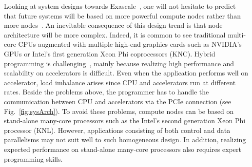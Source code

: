 Looking at system designs towards Exascale~\cite{top500}, one will not hesitate to predict that future systems will be based on more powerful compute nodes rather than more nodes~\cite{Shalf:exascaleChallenges}.  
An inevitable consequence of this design trend is that node architecture will be more complex.
Indeed, it is common to see traditional multi-core CPUs augmented with multiple high-end graphics cards such as NVIDIA's GPUs or Intel's first generation Xeon Phi coprocessors (KNC).
Hybrid programming is challenging~\cite{exascaleRoadMap}, mainly because realizing high performance and scalability on accelerators is difficult.
Even when the application performs well on accelerator, load imbalance arises since CPU and accelerators run at different rates.
Beside the problems above, the programmer has to handle the communication between CPU and accelerators via the PCIe connection (see Fig.~\ref{fig:sysArch}).
To avoid these problems, compute nodes can be based on stand-alone many-core processors such as the Intel's second generation Xeon Phi processor (KNL).
However, applications consisting of both control and data parallelisms may not suit well to such homogeneous design.
In addition, realizing expected performance on stand-alone many-core processors also requires expert programming skills.



